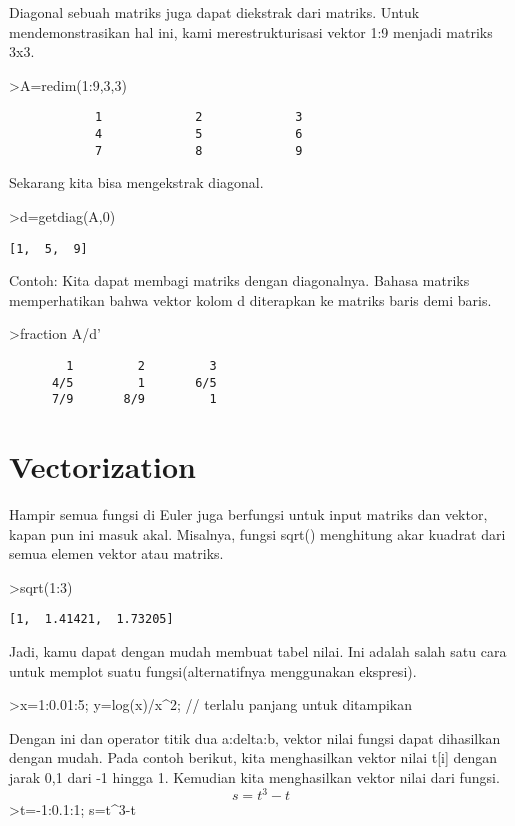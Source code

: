 \documentclass[
]{book}
\begin{document}
Diagonal sebuah matriks juga dapat diekstrak dari matriks. Untuk mendemonstrasikan hal ini, kami merestrukturisasi vektor 1:9 menjadi matriks 3x3.

\textgreater A=redim(1:9,3,3)

\begin{verbatim}
            1             2             3 
            4             5             6 
            7             8             9 
\end{verbatim}

Sekarang kita bisa mengekstrak diagonal.

\textgreater d=getdiag(A,0)

\begin{verbatim}
[1,  5,  9]
\end{verbatim}

Contoh: Kita dapat membagi matriks dengan diagonalnya. Bahasa matriks memperhatikan bahwa vektor kolom d diterapkan ke matriks baris demi baris.

\textgreater fraction A/d'

\begin{verbatim}
        1         2         3 
      4/5         1       6/5 
      7/9       8/9         1 
\end{verbatim}

\section{Vectorization}\label{vectorization}

Hampir semua fungsi di Euler juga berfungsi untuk input matriks dan vektor, kapan pun ini masuk akal. Misalnya, fungsi sqrt() menghitung akar kuadrat dari semua elemen vektor atau matriks.

\textgreater sqrt(1:3)

\begin{verbatim}
[1,  1.41421,  1.73205]
\end{verbatim}

Jadi, kamu dapat dengan mudah membuat tabel nilai. Ini adalah salah satu cara untuk memplot suatu fungsi(alternatifnya menggunakan ekspresi).

\textgreater x=1:0.01:5; y=log(x)/x\^{}2; // terlalu panjang untuk ditampikan

Dengan ini dan operator titik dua a:delta:b, vektor nilai fungsi dapat dihasilkan dengan mudah. Pada contoh berikut, kita menghasilkan vektor nilai t{[}i{]} dengan jarak 0,1 dari -1 hingga 1. Kemudian kita menghasilkan vektor nilai dari fungsi. \[s = t^3-t\]\textgreater t=-1:0.1:1; s=t\^{}3-t
\end{document}
